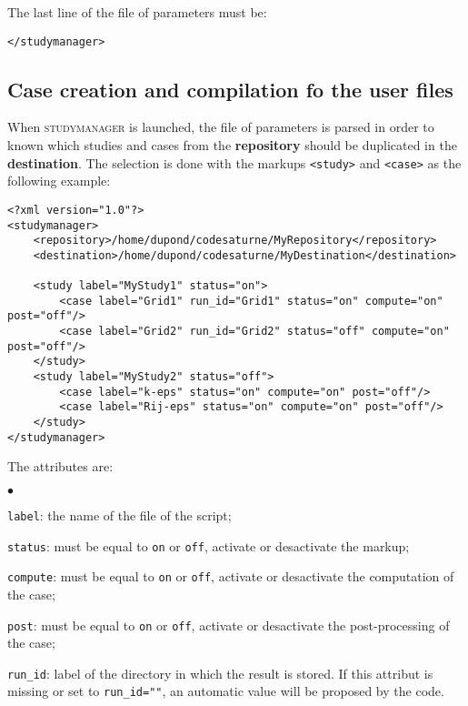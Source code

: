 \documentclass[a4paper,10pt,twoside]{csshortdoc}
\begin{document}
The last line of the file of parameters must be:

\small
\begin{verbatim}
</studymanager>
\end{verbatim}
\normalsize

\subsection{Case creation and compilation fo the user files}

When \textsc{studymanager} is launched, the file of parameters is parsed in order to
known which studies and cases from the \textbf{repository} should be duplicated
in the \textbf{destination}. The selection is done with the markups
\texttt{<study>} and \texttt{<case>} as the following example:

\small
\begin{verbatim}
<?xml version="1.0"?>
<studymanager>
    <repository>/home/dupond/codesaturne/MyRepository</repository>
    <destination>/home/dupond/codesaturne/MyDestination</destination>

    <study label="MyStudy1" status="on">
        <case label="Grid1" run_id="Grid1" status="on" compute="on" post="off"/>
        <case label="Grid2" run_id="Grid2" status="off" compute="on" post="off"/>
    </study>
    <study label="MyStudy2" status="off">
        <case label="k-eps" status="on" compute="on" post="off"/>
        <case label="Rij-eps" status="on" compute="on" post="off"/>
    </study>
</studymanager>
\end{verbatim}
\normalsize

The attributes are:
\begin{list}{$\bullet$}{}
\item \texttt{label}: the name of the file of the script;
\item \texttt{status}: must be equal to \texttt{on} or \texttt{off},
activate or desactivate the markup;
\item \texttt{compute}: must be equal to \texttt{on} or \texttt{off},
activate or desactivate the computation of the case;
\item \texttt{post}: must be equal to \texttt{on} or \texttt{off},
activate or desactivate the post-processing of the case;
\item \texttt{run\_id}: label of the directory in which the result
is stored. If this attribut is missing or set to \texttt{run\_id=""}, an
automatic value will be proposed by the code.
\end{list}
\end{document}
